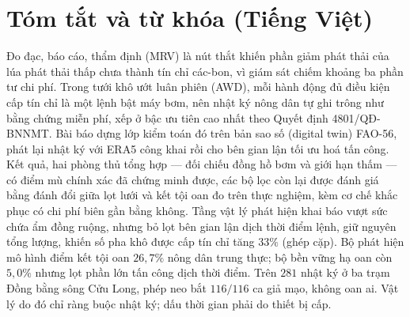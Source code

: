 %
%

\section*{Tóm tắt và từ khóa (Tiếng Việt)}

Đo đạc, báo cáo, thẩm định (MRV) là nút thắt khiến phần giảm phát thải của lúa phát thải thấp chưa thành tín chỉ các-bon, vì giám sát chiếm khoảng ba phần tư chi phí. Trong tưới khô ướt luân phiên (AWD), mỗi hành động đủ điều kiện cấp tín chỉ là một lệnh bật máy bơm, nên nhật ký nông dân tự ghi trông như bằng chứng miễn phí, xếp ở bậc ưu tiên cao nhất theo Quyết định 4801/QĐ-BNNMT. Bài báo dựng lớp kiểm toán đó trên bản sao số (digital twin) FAO-56, phát lại nhật ký với ERA5 công khai rồi cho bên gian lận tối ưu hoá tấn công. Kết quả, hai phòng thủ tổng hợp --- đối chiếu đồng hồ bơm và giới hạn thấm --- có điểm mù
chính xác đã chứng minh được, các bộ lọc còn lại được đánh giá bằng đánh đổi giữa lọt lưới
và kết tội oan đo trên thực nghiệm, kèm cơ chế khắc phục có chi phí biên gần bằng không. Tầng vật lý phát hiện khai báo vượt sức chứa ẩm đồng ruộng, nhưng bỏ lọt bên gian lận dịch thời điểm lệnh, giữ nguyên tổng lượng, khiến số pha khô được cấp tín chỉ tăng $33\%$ (ghép cặp). Bộ phát hiện mô hình điểm kết tội oan $26{,}7\%$ nông dân trung thực; bộ bền vững hạ oan còn $5{,}0\%$ nhưng lọt phần lớn tấn công dịch thời điểm. Trên $281$ nhật ký ở ba trạm Đồng bằng sông Cửu Long, phép neo bắt $116/116$ ca giả mạo, không oan ai. Vật lý do đó chỉ ràng buộc nhật ký; dấu thời gian phải do thiết bị cấp.


